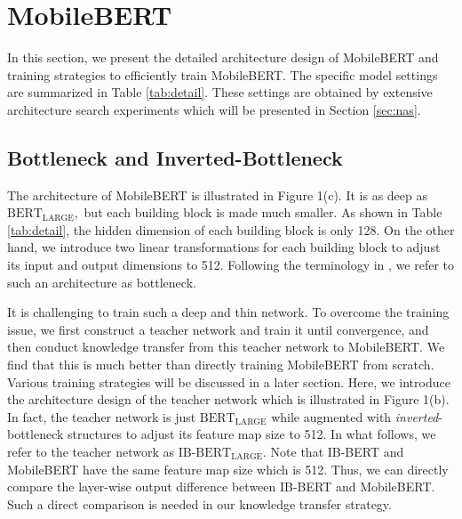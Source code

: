 \documentclass[11pt,a4paper]{article}
\begin{document}
\section{MobileBERT}\label{sec:mobilebert}

In this section, we present the detailed architecture design of MobileBERT and training strategies to efficiently train MobileBERT. The specific model settings are summarized in Table \ref{tab:detail}. These settings are obtained by extensive architecture search experiments which will be presented in Section \ref{sec:nas}.









\subsection{Bottleneck and Inverted-Bottleneck}



The architecture of MobileBERT is illustrated in Figure 1(c). It is as deep as  $\text{BERT}_\text{LARGE}, $  but each building block is made much smaller. As shown in Table \ref{tab:detail}, the hidden dimension of each building block is only 128.  On the other hand, we introduce two linear transformations for each building block to adjust its input and output dimensions to 512. Following the terminology in \citep{he2016deep}, we refer to such an architecture  as  bottleneck. 

It is challenging to train such a deep and thin network. To overcome the training issue, we first construct a teacher network and train it until convergence, and then conduct knowledge transfer from this teacher network to MobileBERT.  We find that this is much better than directly training MobileBERT from scratch. Various training strategies will be discussed in a later section. Here, we introduce the architecture design of the teacher network which is illustrated in Figure 1(b). In fact, the teacher network is just  $\text{BERT}_\text{LARGE}$ while augmented with \emph{inverted}-bottleneck structures \citep{sandler2018mobilenetv2} to adjust its feature map size to 512. 
In what follows, we refer to the teacher network as $\text{IB-BERT}_\text{LARGE}$.
Note that IB-BERT and MobileBERT have the same feature map size which is 512. Thus, we can directly compare the layer-wise output difference between IB-BERT and MobileBERT. Such a direct comparison is needed in our knowledge transfer strategy.
\end{document}
